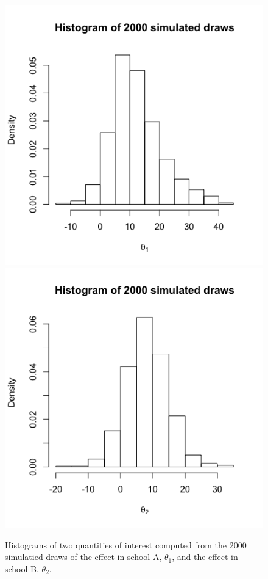 \documentclass[a4paper, 9pt]{article}
\begin{document}
\begin{figure}[h!]
    \centering
    \includegraphics[scale = 0.4]{DStheta1.png}
    \includegraphics[scale = 0.4]{DStheta2.png}
    \caption{Histograms of two quantities of interest computed from the 2000 simulatied draws of the effect in school A, $\theta_1$, and the effect in school B, $\theta_2$.}
    \label{fig:my_label}
\end{figure}
\end{document}
